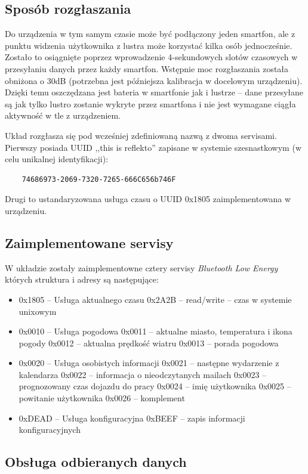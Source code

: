 \documentclass[a4paper,11pt]{article}
\begin{document}
\subsection{Sposób rozgłaszania}
Do urządzenia w tym samym czasie może być podłączony jeden smartfon, ale z punktu widzenia użytkownika z lustra może korzystać kilka osób jednocześnie. Zostało to osiągnięte poprzez wprowadzenie 4-sekundowych slotów czasowych w przesyłaniu danych przez każdy smartfon. Wstępnie moc rozgłaszania została obniżona o 30dB (potrzebna jest późniejsza kalibracja w docelowym urządzeniu). Dzięki temu oszczędzana jest bateria w smartfonie jak i lustrze -- dane przesyłane są jak tylko lustro zostanie wykryte przez smartfona i nie jest wymagane ciągła aktywność w tle z urządzeniem.

Układ rozgłasza się pod wcześniej zdefiniowaną nazwą z dwoma servisami. Pierwszy posiada UUID ,,this is reflekto'' zapisane w systemie szesnastkowym (w celu unikalnej identyfikacji):
\begin{lstlisting}
	74686973-2069-7320-7265-666C656b746F
\end{lstlisting}
Drugi to ustandaryzowana usługa czasu o UUID  0x1805 zaimplementowana w urządzeniu.

\subsection{Zaimplementowane servisy}
W układzie zostały zaimplementowne cztery servisy \textit{Bluetooth Low Energy} których struktura i adresy są następujące:
\begin{itemize}
	\item 0x1805 -- Usługa aktualnego czasu
	\subitem 0x2A2B -- read/write -- czas w systemie unixowym
	\item 0x0010 -- Usługa pogodowa
	\subitem 0x0011 -- aktualne miasto, temperatura i ikona pogody
	\subitem 0x0012 -- aktualna prędkość wiatru
	\subitem 0x0013 -- porada pogodowa
	\item 0x0020 -- Usługa osobistych informacji
	\subitem 0x0021 -- następne wydarzenie z kalendarza
	\subitem 0x0022 -- informacja o nieodczytanych mailach
	\subitem 0x0023 -- prognozowany czas dojazdu do pracy
	\subitem 0x0024 -- imię użytkownika
	\subitem 0x0025 -- powitanie użytkownika
	\subitem 0x0026 -- komplement
	\item  0xDEAD -- Usługa konfiguracyjna
	\subitem 0xBEEF -- zapis informacji konfiguracyjnych
\end{itemize}
\subsection{Obsługa odbieranych danych}
\end{document}
